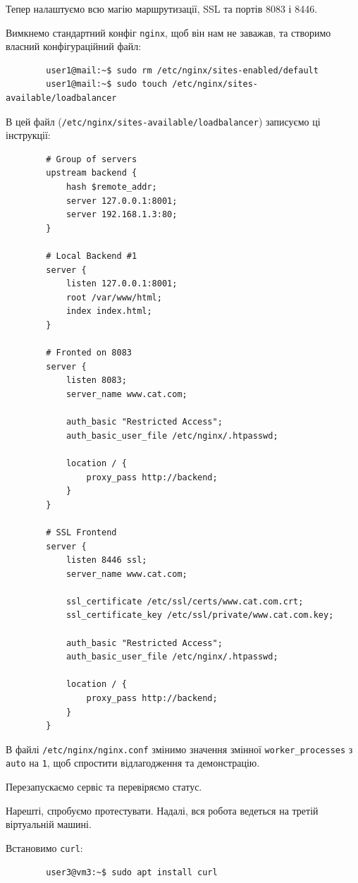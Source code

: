 \documentclass[14pt, a4paper]{extreport}
\begin{document}
	Тепер налаштуємо всю магію маршрутизації, SSL та портів 8083 і 8446.
	
	Вимкнемо стандартний конфіг \texttt{nginx}, щоб він нам не заважав, та створимо власний конфігураційний файл: \sideat{[VM 1]}
	
	\begin{verbatim}
		user1@mail:~$ sudo rm /etc/nginx/sites-enabled/default
		user1@mail:~$ sudo touch /etc/nginx/sites-available/loadbalancer
	\end{verbatim}
	
	В цей файл (\texttt{/etc/nginx/sites-available/loadbalancer}) записуємо ці інструкції: \sideat{[VM 1]}
	
	\begin{verbatim}
		# Group of servers
		upstream backend {
			hash $remote_addr;
			server 127.0.0.1:8001;
			server 192.168.1.3:80;
		}
		
		# Local Backend #1
		server {
			listen 127.0.0.1:8001;
			root /var/www/html;
			index index.html;
		}
		
		# Fronted on 8083
		server {
			listen 8083;
			server_name www.cat.com;
			
			auth_basic "Restricted Access";
			auth_basic_user_file /etc/nginx/.htpasswd;
			
			location / {
				proxy_pass http://backend;
			}
		}
		
		# SSL Frontend
		server {
			listen 8446 ssl;
			server_name www.cat.com;
			
			ssl_certificate /etc/ssl/certs/www.cat.com.crt;
			ssl_certificate_key /etc/ssl/private/www.cat.com.key;
			
			auth_basic "Restricted Access";
			auth_basic_user_file /etc/nginx/.htpasswd;
			
			location / {
				proxy_pass http://backend;
			}
		}
	\end{verbatim}
	
	В файлі \texttt{/etc/nginx/nginx.conf} змінимо значення змінної \texttt{worker\_processes} з \texttt{auto} на \texttt{1}, щоб спростити відлагодження та демонстрацію.
	
	Перезапускаємо сервіс та перевіряємо статус. \sideat{[VM 1]}
	
	
	Нарешті, спробуємо протестувати. Надалі, вся робота ведеться на третій віртуальній машині.
	
	Встановимо \texttt{curl}: \sideat{[VM 3]}
	
	\begin{verbatim}
		user3@vm3:~$ sudo apt install curl
	\end{verbatim}
	
\end{document}
